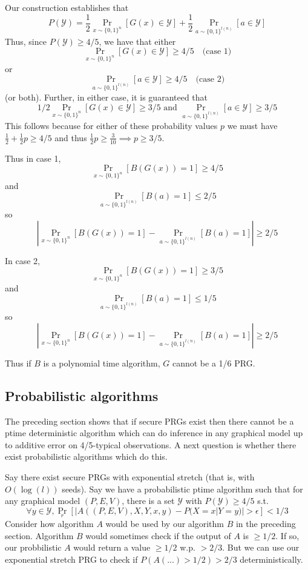 \documentclass{article}
\theoremstyle{definition}
\theoremstyle{remark}
\begin{document}
Our construction establishes that
$$
P(\mathcal{Y}) = \frac{1}{2} \Pr_{x \sim \{0, 1\}^n}[G(x) \in \mathcal{Y}] + \frac{1}{2} \Pr_{a \sim \{0, 1\}^{l(n)}} [a \in \mathcal{Y}]
$$
Thus, since $P(\mathcal{Y}) \geq 4/5$, we have that either
$$
\Pr_{x \sim \{0, 1\}^n} [G(x) \in \mathcal{Y}] \geq 4/5 \quad \text{(case 1)}
$$
or
$$
\Pr_{a \sim \{0, 1\}^{l(n)}} [a \in \mathcal{Y}] \geq 4/5 \quad \text{(case 2)}
$$
(or both).
Further, in either case, it is guaranteed that
$$
1/2\Pr_{x \sim \{0, 1\}^n} [G(x) \in \mathcal{Y}] \geq 3/5 \text{ and }
\Pr_{a \sim \{0, 1\}^{l(n)}} [a \in \mathcal{Y}] \geq 3/5
$$
This follows because for either of these probability values $p$ we must have
$
\frac{1}{2} + \frac{1}{2}p \geq 4/5
$ and thus
$
\frac{1}{2}p \geq \frac{3}{10} \implies p \geq 3/5
$.

Thus in case 1,
$$
\Pr_{x \sim \{0, 1\}^n} [B(G(x)) = 1] \geq 4/5
$$
and
$$
\Pr_{a \sim \{0, 1\}^{l(n)}} [B(a) = 1] \leq 2/5
$$
so 
$$
|\Pr_{x \sim \{0, 1\}^n} [B(G(x)) = 1] - \Pr_{a \sim \{0, 1\}^{l(n)}} [B(a) = 1]| \geq 2/5
$$

In case 2,
$$
\Pr_{x \sim \{0, 1\}^n} [B(G(x)) = 1] \geq 3/5
$$
and
$$
\Pr_{a \sim \{0, 1\}^{l(n)}} [B(a) = 1] \leq 1/5
$$
so 
$$
|\Pr_{x \sim \{0, 1\}^n} [B(G(x)) = 1] - \Pr_{a \sim \{0, 1\}^{l(n)}} [B(a) = 1]| \geq 2/5
$$

Thus if $B$ is a polynomial time algorithm, $G$ cannot be a 1/6 PRG.

\medskip
\subsection{Probabilistic algorithms}
The preceding section shows that if secure PRGs exist then there cannot be a ptime deterministic algorithm which can do inference in any graphical model up to additive error on 4/5-typical observations.
A next question is whether there exist probabilistic algorithms which do this.

Say there exist secure PRGs with exponential stretch (that is, with $O(\log(l))$ seeds).
Say we have a probabilistic ptime algorithm such that for any graphical model $(P, E, V)$, there is a set $\mathcal{Y}$ with $P(\mathcal{Y}) \geq 4/5$ s.t.
$$
\forall y \in \mathcal{Y},
\Pr_r[|A((P, E, V), X, Y, x, y) - P(X = x | Y = y)| > \epsilon] < 1/3
$$
Consider how algorithm $A$ would be used by our algorithm $B$ in the preceding section.
Algorithm $B$ would sometimes check if the output of $A$ is $\geq 1/2$.
If so, our probbilistic $A$ would return a value $\geq 1/2$ w.p. $> 2/3$.
But we can use our exponential stretch PRG to check if $P(A(...) > 1/2) > 2/3$
deterministically.
\end{document}
